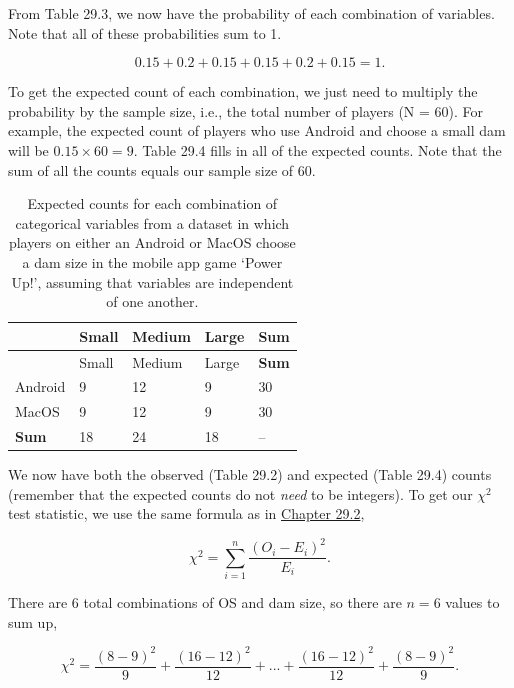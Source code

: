 \documentclass[
]{scrbook}
\begin{document}
From Table 29.3, we now have the probability of each combination of variables.
Note that all of these probabilities sum to 1.

\[0.15 + 0.2 + 0.15 + 0.15 + 0.2 + 0.15 = 1.\]

To get the expected count of each combination, we just need to multiply the probability by the sample size, i.e., the total number of players (N = 60).
For example, the expected count of players who use Android and choose a small dam will be \(0.15 \times 60 = 9\).
Table 29.4 fills in all of the expected counts.
Note that the sum of all the counts equals our sample size of 60.

\begin{longtable}[]{@{}lllll@{}}
\caption{\label{tab:unnamed-chunk-142}Expected counts for each combination of categorical variables from a dataset in which players on either an Android or MacOS choose a dam size in the mobile app game `Power Up!', assuming that variables are independent of one another.}\tabularnewline
\toprule
& Small & Medium & Large & \textbf{Sum} \\
\midrule
\endfirsthead
\toprule
& Small & Medium & Large & \textbf{Sum} \\
\midrule
\endhead
Android & 9 & 12 & 9 & 30 \\
MacOS & 9 & 12 & 9 & 30 \\
\textbf{Sum} & 18 & 24 & 18 & -- \\
\bottomrule
\end{longtable}

We now have both the observed (Table 29.2) and expected (Table 29.4) counts (remember that the expected counts do not \emph{need} to be integers).
To get our \(\chi^{2}\) test statistic, we use the same formula as in \protect\hyperlink{chi-squared-goodness-of-fit}{Chapter 29.2},

\[\chi^{2} = \sum_{i = 1}^{n} \frac{\left(O_{i} - E_{i}\right)^{2}}{E_{i}}.\]

There are 6 total combinations of OS and dam size, so there are \(n = 6\) values to sum up,

\[\chi^{2} = \frac{(8-9)^2}{9} + \frac{(16 - 12)^{2}}{12} + ... + \frac{(16 - 12)^{2}}{12} + \frac{(8-9)^2}{9}.\]
\end{document}

